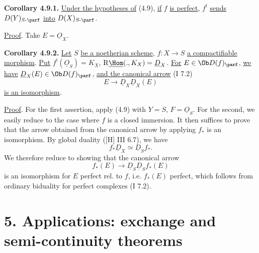 \textbf{Corollary 4.9.1.} \uline{Under the hypotheses of} (4.9), \uline{if} \(f\) \uline{is perfect}, \(f^!\) \uline{sends} \(D(Y)_{S\text{-}\parf}\) \uline{into} \(D(X)_{S\text{-}\parf}\).

\uline{Proof}. Take \(E=\underline{O}_X\).

\textbf{Corollary 4.9.2.} \uline{Let} \(S\) \uline{be a noetherian scheme}, \(f:X\to S\) \uline{a compactifiable morphism}. \uline{Put} \(f^!(\underline{O}_S)=K_X\), \(\mathrm R\underline{\Hom}(.,K_X)=\underline{D}_X\). \uline{For} \(E\in\Ob D(f)_{\parf}\), \uline{we have} \(\underline{D}_X(E)\in\Ob D(f)_{\parf}\), \uline{and the canonical arrow} (I 7.2)
\[
 E\longrightarrow \underline{D}_X\underline{D}_X(E)
\]
\uline{is an isomorphism}.

\uline{Proof}. For the first assertion, apply (4.9) with \(Y=S\), \(F=\underline{O}_S\). For the second, we easily reduce to the case where \(f\) is a closed immersion. It then suffices to prove that the arrow obtained from the canonical arrow by applying \(f_*\) is an isomorphism. By global duality ([H] III 6.7), we have
\[
 f_*\underline{D}_X\simeq\underline{D}_Sf_*.
\]
We therefore reduce to showing that the canonical arrow
\[
 f_*(E)\longrightarrow \underline{D}_S\underline{D}_Sf_*(E)
\]
is an isomorphism for \(E\) perfect rel. to \(f\), i.e. \(f_*(E)\) perfect, which follows from ordinary biduality for perfect complexes (I 7.2).

\section*{5. Applications: exchange and semi-continuity theorems}


